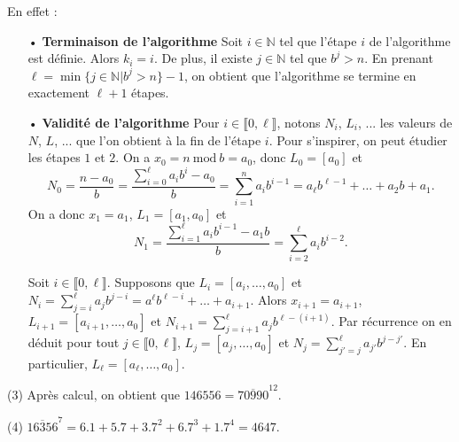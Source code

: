 \documentclass[11pt,a4paper]{article}
\newcommand{\N}{\mathbb{N}}
\begin{document}
En effet : \begin{itemize}
\item[•] \textbf{Terminaison de l'algorithme}  Soit $i\in \N$ tel que l'étape $i$ de l'algorithme est définie. Alors $k_i=i$. De plus, il existe $j\in \N$ tel que $b^j>n$. En prenant $\ell=\min\{ j\in \N|b^j>n\}-1$, on obtient que l'algorithme se termine en exactement $\ell+1$ étapes.

\item[•] \textbf{Validité de l'algorithme} Pour $i\in \llbracket 0,\ell\rrbracket$, notons $N_i$, $L_i$, ... les valeurs de  $N$, $L$, ... que l'on obtient à la fin de l'étape $i$. Pour s'inspirer, on peut étudier les étapes $1$ et $2$.  On a   $x_0=n\mathrm{\ mod\ }b=a_0$, donc $L_0=[a_0]$ et \[N_0=\frac{n-a_0}{b}=\frac{\sum_{i=0}^\ell a_i b^i-a_0}{b}=\sum_{i=1}^n a_i b^{i-1}=a_\ell b^{\ell-1}+\ldots + a_2 b+ a_1.\] On a donc $x_1=a_1$, $L_1=[a_1,a_0]$ et \[N_1=\frac{\sum_{i=1}^\ell a_i b^{i-1}-a_1 b}{b}=\sum_{i=2}^\ell a_i b^{i-2}.\]

    Soit $i\in \llbracket 0,\ell\rrbracket$. Supposons  que $L_i=[a_i,\ldots,a_0]$ et $N_i=\sum_{j=i}^\ell a_j b^{j-i}=a^\ell b^{\ell-i}+\ldots + a_{i+1}$. Alors $x_{i+1}=a_{i+1}$, $L_{i+1}=[a_{i+1},\ldots,a_0]$ et $N_{i+1}=\sum_{j=i+1}^\ell a_j b^{\ell-(i+1)}$. Par récurrence on en déduit pour tout $j\in \llbracket 0,\ell\rrbracket$, $L_j=[a_j,\ldots,a_0]$ et $N_j=\sum_{j'=j}^{\ell} a_{j'} b^{j-j'}$. En particulier, $L_\ell=[a_\ell,\ldots,a_0]$.
\end{itemize}

(3) Après calcul, on obtient que $146556=\overline{70990}^{12}$.

(4) $\overline{16356}^7=6.1+5.7+3.7^2+6.7^3+1.7^4=4647$.
\end{document}
